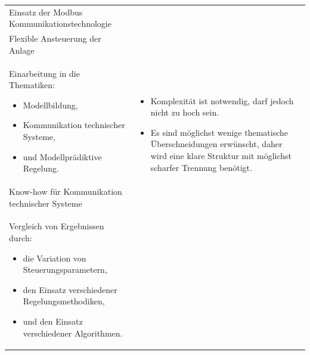\begin{table}[H]
\begin{tabularx}{1\textwidth}{m{}m{}}
\cmidrule[0.1pt](lr{2em}){1-1}
\addlinespace[4mm] Einsatz der Modbus \newline Kommunikationstechnologie \newline 	& 		\\

\cmidrule[0.1pt](lr{2em}){1-1}
\addlinespace[4mm] Flexible Ansteuerung der Anlage \newline & \\

\cmidrule[0.5pt](r{0.25em}){1-1} 
\cmidrule[0.5pt](l{0.25em}){2-2}

Einarbeitung in die Thematiken:
\begin{minipage}[t]{0.34\textwidth}
\begin{itemize}[itemsep=0pt,topsep=0pt,leftmargin=4mm]
	\item Modellbildung,
	\item Kommunikation technischer \newline Systeme,
	\item und Modellprädiktive \newline Regelung.
\end{itemize}
\end{minipage}
 	& \multirow{2}{\hsize}{
\begin{minipage}[t]{0.57\textwidth}
\begin{itemize}[itemsep=0pt,topsep=0pt,leftmargin=5mm]
	\item Komplexität ist notwendig, darf jedoch nicht zu hoch sein.
	\item Es sind möglichst wenige thematische Überschneidungen erwünscht, daher wird eine klare Struktur mit möglichst scharfer Trennung benötigt.
\end{itemize}
\end{minipage}
}  \\

\cmidrule[0.1pt](lr{2em}){1-1} 

Know-how für Kommunikation \newline technischer Systeme 	&		\\

\cmidrule[0.5pt](r{0.25em}){1-1} 
\cmidrule[0.5pt](l{0.25em}){2-2}

Vergleich von Ergebnissen durch:
\begin{minipage}[t]{0.34\textwidth}
\begin{itemize}[itemsep=0pt,topsep=1pt,leftmargin=4mm]
	\item die Variation von \newline Steuerungsparametern,
	\item den Einsatz verschiedener \newline Regelungsmethodiken,
	\item und den Einsatz \newline verschiedener Algorithmen.
\end{itemize}
\end{minipage}


\end{tabularx}
\end{table}
